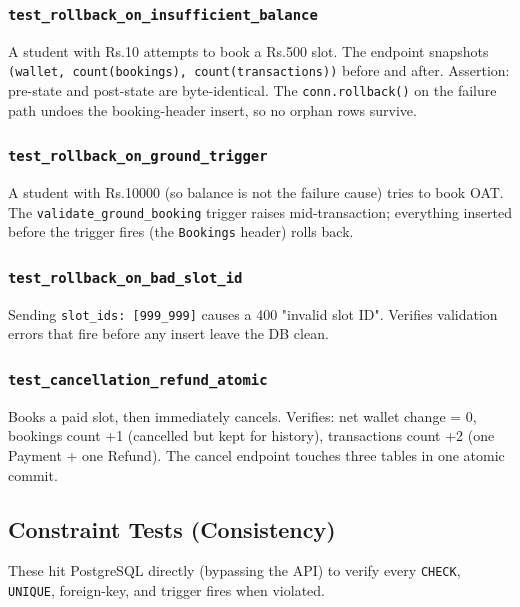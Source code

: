 \documentclass[11pt,a4paper]{article}
\begin{document}
\subsubsection{\texttt{test\_rollback\_on\_insufficient\_balance}}

A student with Rs.10 attempts to book a Rs.500 slot. The endpoint snapshots \texttt{(wallet, count(bookings), count(transactions))} before and after. Assertion: pre-state and post-state are byte-identical. The \texttt{conn.rollback()} on the failure path undoes the booking-header insert, so no orphan rows survive.

\subsubsection{\texttt{test\_rollback\_on\_ground\_trigger}}

A student with Rs.10000 (so balance is not the failure cause) tries to book OAT. The \texttt{validate\_ground\_booking} trigger raises mid-transaction; everything inserted before the trigger fires (the \texttt{Bookings} header) rolls back.

\subsubsection{\texttt{test\_rollback\_on\_bad\_slot\_id}}

Sending \texttt{slot\_ids: [999\_999]} causes a 400 "invalid slot ID". Verifies validation errors that fire before any insert leave the DB clean.

\subsubsection{\texttt{test\_cancellation\_refund\_atomic}}

Books a paid slot, then immediately cancels. Verifies: net wallet change = 0, bookings count +1 (cancelled but kept for history), transactions count +2 (one Payment + one Refund). The cancel endpoint touches three tables in one atomic commit.

\subsection{Constraint Tests (Consistency)}

These hit PostgreSQL directly (bypassing the API) to verify every \texttt{CHECK}, \texttt{UNIQUE}, foreign-key, and trigger fires when violated.
\end{document}
